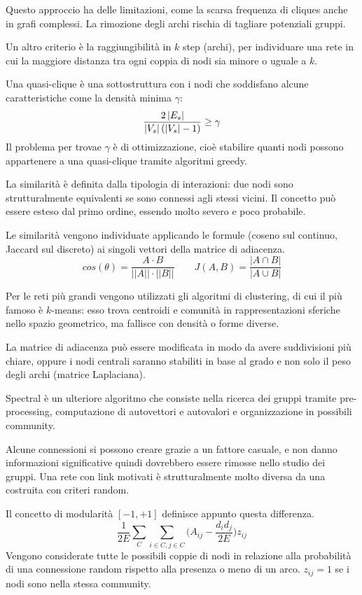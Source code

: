 Questo approccio ha delle limitazioni, come la scarsa frequenza di cliques anche in grafi complessi. La rimozione degli archi rischia di tagliare potenziali gruppi. 

Un altro criterio è la raggiungibilità in $k$ step (archi), per individuare una rete in cui la maggiore distanza tra ogni coppia di nodi sia minore o uguale a $k$. 

Una quasi-clique è una sottostruttura con i nodi che soddisfano alcune caratteristiche come la densità minima $\gamma$:
$$\frac{2\left|E_s\right|}{\left|V_s\right|(\left|V_s\right| - 1)} \geq \gamma$$
Il problema per trovae $\gamma$ è di ottimizzazione, cioè stabilire quanti nodi possono appartenere a una quasi-clique tramite algoritmi greedy.

La similarità è definita dalla tipologia di interazioni: due nodi sono strutturalmente equivalenti se sono connessi agli stessi vicini. Il concetto può essere esteso dal primo ordine, essendo molto severo e poco probabile. 

Le similarità vengono individuate applicando le formule (coseno sul continuo, Jaccard sul discreto) ai singoli vettori della matrice di adiacenza. 
$$cos(\theta) = \frac{A \cdot B}{||A|| \cdot ||B||} \qquad J(A, B) = \frac{|A \cap B|}{|A \cup B|}$$

Per le reti più grandi vengono utilizzati gli algoritmi di clustering, di cui il più famoso è $k$-means: esso trova centroidi e comunità in rappresentazioni sferiche nello spazio geometrico, ma fallisce con densità o forme diverse. 

La matrice di adiacenza può essere modificata in modo da avere suddivisioni più chiare, oppure i nodi centrali saranno stabiliti in base al grado e non solo il peso degli archi (matrice Laplaciana).

Spectral è un ulteriore algoritmo che consiste nella ricerca dei gruppi tramite pre-processing, computazione di autovettori e autovalori e organizzazione in possibili community. 

Alcune connessioni si possono creare grazie a un fattore casuale, e non danno informazioni significative quindi dovrebbero essere rimosse nello studio dei gruppi. Una rete con link motivati è strutturalmente molto diversa da una costruita con criteri random.

Il concetto di modularità $[-1, +1]$  definisce appunto questa differenza. 
$$\frac{1}{2E} \sum_{C} \sum_{i \in C, j \in C} \Big(A_{ij} - \frac{d_id_j}{2E}\Big) z_{ij}$$
Vengono considerate tutte le possibili coppie di nodi in relazione alla probabilità di una connessione random rispetto alla presenza o meno di un arco. $z_{ij} = 1$ se i nodi sono nella stessa community.

